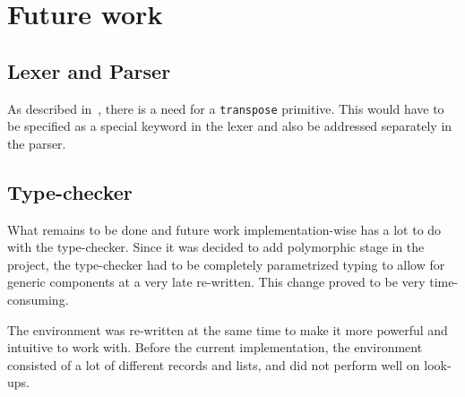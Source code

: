 \section{Future work}
\subsection{Lexer and Parser}
As described in~, there is a need for a
\texttt{transpose} primitive. This would have to be specified as a
special keyword in the lexer and also be addressed separately in the
parser.


\subsection{Type-checker}
What remains to be done and future work implementation-wise has a lot
to do with the type-checker. Since it was decided to add polymorphic
stage in the project, the type-checker had to be completely
parametrized typing to allow for generic components at a very late
re-written. This change proved to be very time-consuming.

The environment was re-written at the same time to make it more
powerful and intuitive to work with. Before the current
implementation, the environment consisted of a lot of different
records and lists, and did not perform well on look-ups.
